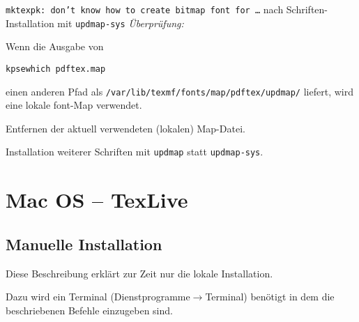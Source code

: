 \begin{itemize}
\begin{knownissue}{
  \texttt{mktexpk: don't know how to create bitmap font for \ldots}\newline
  nach Schriften-Installation mit \lstinline{updmap-sys}}
\noindent\textit{Überprüfung:}

Wenn die Ausgabe von
\begin{lstlisting}[style=cmd]
kpsewhich pdftex.map
\end{lstlisting}
einen anderen Pfad als
\lstinline{/var/lib/texmf/fonts/map/pdftex/updmap/} liefert,
wird eine lokale font-Map verwendet.


Entfernen der aktuell verwendeten (lokalen) Map-Datei.


Installation weiterer Schriften mit \lstinline{updmap} statt
\lstinline{updmap-sys}.

\end{knownissue}

\end{itemize}

\clearpage
\section{Mac OS -- TexLive}%

\subsection{Manuelle Installation}

Diese Beschreibung erklärt zur Zeit nur die lokale Installation.

Dazu wird ein Terminal {\sffamily(Dienstprogramme$\to$Terminal)}
benötigt in dem die beschriebenen Befehle einzugeben sind.

